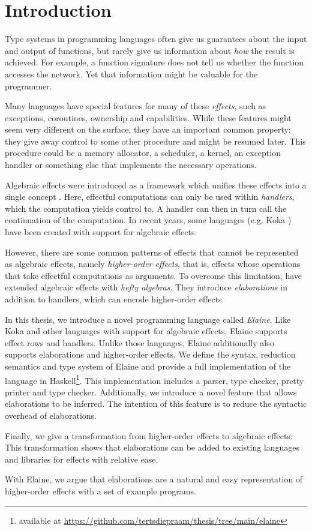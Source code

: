 \chapter{Introduction}\label{chap:introduction}

Type systems in programming languages often give us guarantees about the input and output of functions, but rarely give us information about \emph{how} the result is achieved. For example, a function signature does not tell us whether the function accesses the network. Yet that information might be valuable for the programmer.

Many languages have special features for many of these \emph{effects}, such as exceptions, coroutines, ownership and capabilities. While these features might seem very different on the surface, they have an important common property: they give away control to some other procedure and might be resumed later. This procedure could be a memory allocator, a scheduler, a kernel, an exception handler or something else that implements the necessary operations.

Algebraic effects were introduced as a framework which unifies these effects into a single concept \autocite{goos_adequacy_2001, castagna_handlers_2009}. Here, effectful computations can only be used within \emph{handlers}, which the computation yields control to. A handler can then in turn call the continuation of the computation. In recent years, some languages (e.g. Koka \autocite{leijen_type_2017}) have been created with support for algebraic effects.

However, there are some common patterns of effects that cannot be represented as algebraic effects, namely \emph{higher-order effects}, that is, effects whose operations that take effectful computations as arguments. To overcome this limitation, \textcite{bach_poulsen_hefty_2023} have extended algebraic effects with \emph{hefty algebras}. They introduce \emph{elaborations} in addition to handlers, which can encode higher-order effects.

In this thesis, we introduce a novel programming language called \emph{Elaine}. Like Koka and other languages with support for algebraic effects, Elaine supports effect rows and handlers. Unlike those languages, Elaine additionally also supports elaborations and higher-order effects. We define the syntax, reduction semantics and type system of Elaine and provide a full implementation of the language in Haskell\footnote{available at \url{https://github.com/tertsdiepraam/thesis/tree/main/elaine}}. This implementation includes a parser, type checker, pretty printer and type checker. Additionally, we introduce a novel feature that allows elaborations to be inferred. The intention of this feature is to reduce the syntactic overhead of elaborations.

Finally, we give a transformation from higher-order effects to algebraic effects. This transformation shows that elaborations can be added to existing languages and libraries for effects with relative ease.

With Elaine, we argue that elaborations are a natural and easy representation of higher-order effects with a set of example programs.
